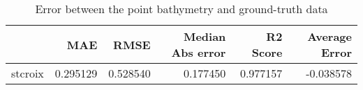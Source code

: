 \begin{table}[h!]
\caption{Error between the point bathymetry and ground-truth data}
\label{tab:stcroix_lidar_error}
\begin{tabular}{lrrrrr}
\toprule
 & MAE & RMSE & Median Abs error & R2 Score & Average Error \\
\midrule
stcroix & 0.295129 & 0.528540 & 0.177450 & 0.977157 & -0.038578 \\
\bottomrule
\end{tabular}
\end{table}
